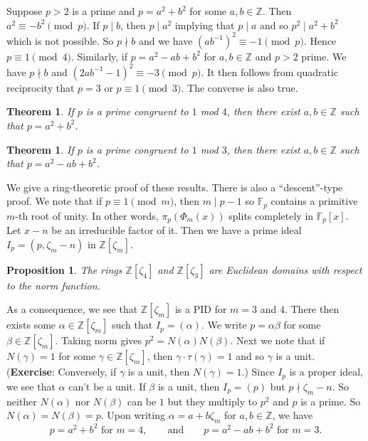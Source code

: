 \documentclass{article}
\def\Z{{\mathbb Z}}
\def\F{{\mathbb F}}
\def\Z{{\mathbb Z}}
\def\F{{\mathbb F}}
\newtheorem{theorem}[subsection]{Theorem}
\newtheorem{proposition}[subsection]{Proposition}
\begin{document}
Suppose $p>2$ is a prime and $p = a^2 + b^2$ for some $a,b\in\Z$. Then $a^2\equiv -b^2\pmod{p}$. If $p\mid b$, then $p\mid a^2$ implying that $p\mid a$ and so $p^2\mid a^2 + b^2$ which is not possible. So $p\nmid b$ and we have $(ab^{-1})^2\equiv -1\pmod{p}$. Hence $p\equiv 1\pmod{4}$.
Similarly, if $p = a^2 - ab + b^2$ for $a,b\in\Z$ and $p>2$ prime. We have $p\nmid b$ and $(2ab^{-1} - 1)^2\equiv -3\pmod{p}$. It then follows from quadratic reciprocity that $p=3$ or $p\equiv 1\pmod{3}$. The converse is also true.

\begin{theorem}\label{thm:p14}
    If $p$ is a prime congruent to $1$ mod $4$, then there exist $a,b\in\Z$ such that $p = a^2 + b^2$.
\end{theorem}

\begin{theorem}\label{thm:p23}
    If $p$ is a prime congruent to $1$ mod $3$, then there exist $a,b\in\Z$ such that $p = a^2 - ab + b^2$.
\end{theorem}

We give a ring-theoretic proof of these results. There is also a ``descent''-type proof. We note that if $p\equiv 1\pmod{m}$, then $m\mid p-1$ so $\F_p$ contains a primitive $m$-th root of unity. In other words, $\pi_p(\Phi_m(x))$ splits completely in $\F_p[x]$. Let $x - n$ be an irreducible factor of it. Then we have a prime ideal $I_p = (p, \zeta_m - n)$ in $\Z[\zeta_m]$.

\begin{proposition}\label{prop:34Euc}
    The rings $\Z[\zeta_4]$ and $\Z[\zeta_3]$ are Euclidean domains with respect to the norm function.
\end{proposition}

As a consequence, we see that $\Z[\zeta_m]$ is a PID for $m = 3$ and $4$. There then exists some $\alpha\in\Z[\zeta_m]$ such that $I_p = (\alpha)$. We write $p = \alpha\beta$ for some $\beta\in\Z[\zeta_m]$. Taking norm gives $p^2 = N(\alpha)N(\beta)$. Next we note that if $N(\gamma) = 1$ for some $\gamma\in\Z[\zeta_m]$, then $\gamma\cdot \tau(\gamma) = 1$ and so $\gamma$ is a unit. (\textbf{Exercise}: Conversely, if $\gamma$ is a unit, then $N(\gamma) = 1$.) Since $I_p$ is a proper ideal, we see that $\alpha$ can't be a unit. If $\beta$ is a unit, then $I_p = (p)$ but $p\nmid \zeta_m - n$. So neither $N(\alpha)$ nor $N(\beta)$ can be $1$ but they multiply to $p^2$ and $p$ is a prime. So $N(\alpha) = N(\beta) = p$. Upon writing $\alpha = a + b\zeta_m$ for $a,b\in\Z$, we have
$$p = a^2 + b^2\mbox{ for }m=4,\qquad\mbox{and}\qquad p = a^2 - ab + b^2\mbox{ for }m=3.$$
\end{document}
